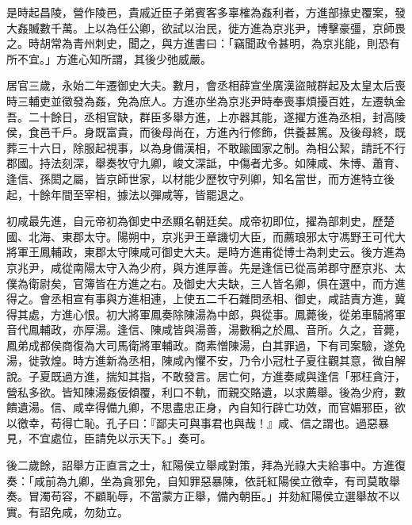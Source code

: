 \begin{pinyinscope}
是時起昌陵，營作陵邑，貴戚近臣子弟賓客多辜榷為姦利者，方進部掾史覆案，發大姦贓數千萬。上以為任公卿，欲試以治民，徙方進為京兆尹，博擊豪彊，京師畏之。時胡常為青州刺史，聞之，與方進書曰：「竊聞政令甚明，為京兆能，則恐有所不宜。」方進心知所謂，其後少弛威嚴。

居官三歲，永始二年遷御史大夫。數月，會丞相薛宣坐廣漢盜賊群起及太皇太后喪時三輔吏並徵發為姦，免為庶人。方進亦坐為京兆尹時奉喪事煩擾百姓，左遷執金吾。二十餘日，丞相官缺，群臣多舉方進，上亦器其能，遂擢方進為丞相，封高陵侯，食邑千戶。身既富貴，而後母尚在，方進內行修飾，供養甚篤。及後母終，既葬三十六日，除服起視事，以為身備漢相，不敢踰國家之制。為相公絜，請託不行郡國。持法刻深，舉奏牧守九卿，峻文深詆，中傷者尤多。如陳咸、朱博、蕭育、逢信、孫閎之屬，皆京師世家，以材能少歷牧守列卿，知名當世，而方進特立後起，十餘年間至宰相，據法以彈咸等，皆罷退之。

初咸最先進，自元帝初為御史中丞顯名朝廷矣。成帝初即位，擢為部刺史，歷楚國、北海、東郡太守。陽朔中，京兆尹王章譏切大臣，而薦琅邪太守馮野王可代大將軍王鳳輔政，東郡太守陳咸可御史大夫。是時方進甫從博士為刺史云。後方進為京兆尹，咸從南陽太守入為少府，與方進厚善。先是逢信已從高弟郡守歷京兆、太僕為衛尉矣，官簿皆在方進之右。及御史大夫缺，三人皆名卿，俱在選中，而方進得之。會丞相宣有事與方進相連，上使五二千石雜問丞相、御史，咸詰責方進，冀得其處，方進心恨。初大將軍鳳奏除陳湯為中郎，與從事。鳳薨後，從弟車騎將軍音代鳳輔政，亦厚湯。逢信、陳咸皆與湯善，湯數稱之於鳳、音所。久之，音薨，鳳弟成都侯商復為大司馬衛將軍輔政。商素憎陳湯，白其罪過，下有司案驗，遂免湯，徙敦煌。時方進新為丞相，陳咸內懼不安，乃令小冠杜子夏往觀其意，微自解說。子夏既過方進，揣知其指，不敢發言。居亡何，方進奏咸與逢信「邪枉貪汙，營私多欲。皆知陳湯姦佞傾覆，利口不軌，而親交賂遺，以求薦舉。後為少府，數饋遺湯。信、咸幸得備九卿，不思盡忠正身，內自知行辟亡功效，而官媚邪臣，欲以徼幸，苟得亡恥。孔子曰：『鄙夫可與事君也與哉！』咸、信之謂也。過惡暴見，不宜處位，臣請免以示天下。」奏可。

後二歲餘，詔舉方正直言之士，紅陽侯立舉咸對策，拜為光祿大夫給事中。方進復奏：「咸前為九卿，坐為貪邪免，自知罪惡暴陳，依託紅陽侯立徼幸，有司莫敢舉奏。冒濁苟容，不顧恥辱，不當蒙方正舉，備內朝臣。」并劾紅陽侯立選舉故不以實。有詔免咸，勿劾立。


\end{pinyinscope}
